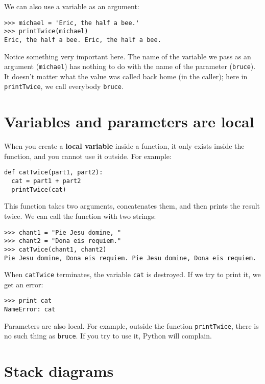 We can also use a variable as an argument:

\beforeverb
\begin{verbatim}
>>> michael = 'Eric, the half a bee.'
>>> printTwice(michael)
Eric, the half a bee. Eric, the half a bee.
\end{verbatim}
\afterverb
%
Notice something very important here. The name of the variable we pass
as an argument ({\tt michael}) has nothing to do with the name of the
parameter ({\tt bruce}).  It doesn't matter what the value was
called back home (in the caller); here in {\tt printTwice}, we call
everybody {\tt bruce}.


\section{Variables and parameters are local}

When you create a {\bf local variable} inside a function, it only exists inside
the function, and you cannot use it outside.  For example:

\beforeverb
\begin{verbatim}
def catTwice(part1, part2):
  cat = part1 + part2
  printTwice(cat)
\end{verbatim}
\afterverb
%
This function takes two arguments, concatenates them, and then prints
the result twice.
We can call the function with two strings:

\beforeverb
\begin{verbatim}
>>> chant1 = "Pie Jesu domine, "
>>> chant2 = "Dona eis requiem."
>>> catTwice(chant1, chant2)
Pie Jesu domine, Dona eis requiem. Pie Jesu domine, Dona eis requiem.
\end{verbatim}
\afterverb
%
When {\tt catTwice} terminates, the variable {\tt cat} is destroyed.
If we try to print it, we get an error:

\beforeverb
\begin{verbatim}
>>> print cat
NameError: cat
\end{verbatim}
\afterverb
%
Parameters are also local.
For example, outside the function {\tt printTwice}, there is no
such thing as {\tt bruce}.  If you try to use it, Python will
complain.


\section{Stack diagrams}
\label{stackdiagram}

